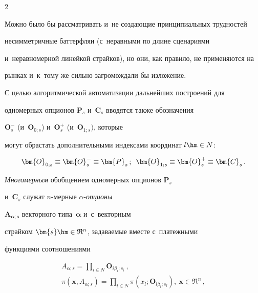 \begin{multicols}{2}
  


  Можно было бы рассматривать и~не создающие принципиальных трудностей 


несимметричные баттерфляи (с~неравными по длине сценариями 


и~неравномерной линейкой страйков), но они, как правило, не применяются на 


рынках и~к~тому же сильно загромождали бы изложение. 


  


  С целью алгоритмической автоматизации дальнейших построений для 


одномерных опционов $\bm{P}_s$ и~$\bm{C}_s$ вводятся также обозначения 


$\bm{O}_s^-$ (и~$\bm{O}_{0;s}$) и~$\bm{O}_s^+$ (и~$\bm{O}_{1;s})$, которые 


могут обрастать дополнительными индексами координат $l\hm\in N$: 


  \begin{equation}


  \bm{O}_{0;s}\equiv \bm{O}_s^- \equiv \bm{P}_s\,;\enskip


  \bm{O}_{1;s} \equiv \bm{O}_s^+\equiv \bm{C}_s\,.


  \label{e8-aga}


  \end{equation}


  


  \textit{Многомерным} обобщением одномерных опционов $\bm{P}_s$ 


и~$\bm{C}_s$ служат $n$-мер\-ные $\alpha$-\textit{оп\-ци\-оны} 


$\bm{A}_{\bm{\alpha};\bm{s}}$ векторного типа~$\bm{\alpha}$ и~с~векторным 


страйком $\bm{s}\hm \in \mathfrak{R}^n$, задаваемые вместе с~платежными 


функциями соотношениями 


  \begin{multline}


  {A}_{\alpha;s}=\prod\limits_{i\in N} \bm{O}_{i\beta_i;s_i}\,,\\


  \pi\left(\bm{x}, A_{\alpha;s}\right)=


  \prod_{l\in N}\pi \left(x_l; \bm{O}_{l\beta_l;s_l}\right),\ \bm{x}\in 


\mathfrak{R}^n\,,\\[6pt]



\end{multline}
\end{multicols}

